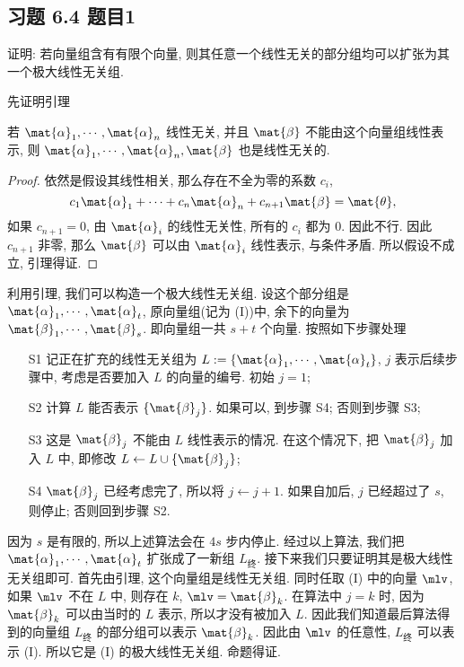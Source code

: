 \subsection*{ 习题 6.4 题目1 }
\begin{problem*}
证明: 若向量组含有有限个向量, 则其任意一个线性无关的部分组均可以扩张为其一个极大线性无关组.
\end{problem*}
\begin{solution}
先证明引理
\begin{lemma}
    若 $\mat{\alpha}_1, \cdots, \mat{\alpha}_n$ 线性无关, 并且 $\mat{\beta}$ 不能由这个向量组线性表示, 则 $\mat{\alpha}_1, \cdots, \mat{\alpha}_n, \mat{\beta}$ 也是线性无关的.
\end{lemma}
\begin{proof}
    依然是假设其线性相关, 那么存在不全为零的系数 $c_i$,
    \[
        c_1 \mat{\alpha}_1 + \cdots + c_n \mat{\alpha}_n + c_{n + 1} \mat{\beta} = \mat{\theta},
    \]
    如果 $c_{n + 1} = 0$, 由 $\mat{\alpha}_i$ 的线性无关性, 所有的 $c_i$ 都为 $0$. 因此不行. 因此 $c_{n + 1}$ 非零, 那么 $\mat{\beta}$ 可以由 $\mat{\alpha}_i$ 线性表示, 与条件矛盾. 所以假设不成立, 引理得证.
\end{proof}

利用引理, 我们可以构造一个极大线性无关组. 设这个部分组是 $\mat{\alpha}_1, \cdots, \mat{\alpha}_t$, 原向量组(记为 (I))中, 余下的向量为 $\mat{\beta}_1, \cdots, \mat{\beta}_s$. 即向量组一共 $s + t$ 个向量. 按照如下步骤处理
\begin{enumerate}
    \item[S1] 记正在扩充的线性无关组为 $L := \{\mat{\alpha}_1, \cdots, \mat{\alpha}_t\}$, $j$ 表示后续步骤中, 考虑是否要加入 $L$ 的向量的编号. 初始 $j = 1$;
    \item[S2] 计算 $L$ 能否表示 $\{\mat{\beta}_j\}$. 如果可以, 到步骤 S4; 否则到步骤 S3;
    \item[S3] 这是 $\mat{\beta}_j$ 不能由 $L$ 线性表示的情况. 在这个情况下, 把 $\mat{\beta}_j$ 加入 $L$ 中, 即修改 $L \leftarrow L \cup\{\mat{\beta}_j\}$;
    \item[S4] $\mat{\beta}_j$ 已经考虑完了, 所以将 $j \leftarrow j + 1$. 如果自加后, $j$ 已经超过了 $s$, 则停止; 否则回到步骤 S2.
\end{enumerate}

因为 $s$ 是有限的, 所以上述算法会在 $4s$ 步内停止. 经过以上算法, 我们把 $\mat{\alpha}_1, \cdots, \mat{\alpha}_t$ 扩张成了一新组 $L_{\text{终}}$. 接下来我们只要证明其是极大线性无关组即可. 首先由引理, 这个向量组是线性无关组. 同时任取 (I) 中的向量 $\mlv$, 如果 $\mlv$ 不在 $L$ 中, 则存在 $k$, $\mlv = \mat{\beta}_k$. 在算法中 $j = k$ 时, 因为 $\mat{\beta}_k$ 可以由当时的 $L$ 表示, 所以才没有被加入 $L$. 因此我们知道最后算法得到的向量组 $L_{\text{终}}$ 的部分组可以表示 $\mat{\beta}_k$. 因此由 $\mlv$ 的任意性, $L_{\text{终}}$ 可以表示 (I). 所以它是 (I) 的极大线性无关组. 命题得证.
\end{solution}


